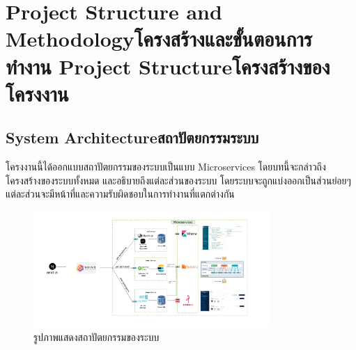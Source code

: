 \chapter{\ifproject%
\ifenglish Project Structure and Methodology\else โครงสร้างและขั้นตอนการทำงาน\fi
\else%
\ifenglish Project Structure\else โครงสร้างของโครงงาน\fi
\fi
}


\newcommand{\iptoDomain}[2]{\texttt{#1} $\rightarrow$ \texttt{#2}}

\makeatletter


\makeatother

\section{\ifenglish System Architecture\else สถาปัตยกรรมระบบ\fi}

\hspace{1.27cm} \raggedright โครงงานนี้ได้ออกแบบสถาปัตยกรรมของระบบเป็นแบบ Microservices โดยบทนี้จะกล่าวถึงโครงสร้างของระบบทั้งหมด และอธิบายถึงแต่ละส่วนของระบบ โดยระบบจะถูกแบ่งออกเป็นส่วนย่อยๆแต่ละส่วนจะมีหน้าที่และความรับผิดชอบในการทำงานที่แตกต่างกัน 

\begin{figure}[H]
    \centering
    \includegraphics[width=0.8\textwidth]{pictures/architecture.png}
    \caption{รูปภาพแสดงสถาปัตยกรรมของระบบ}
    \label{fig:system_architecture}
  
\end{figure}

